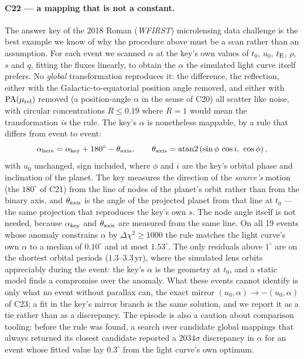 \paragraph{C22 --- a mapping that is not a constant.}  The answer key of
the 2018 Roman (\textit{WFIRST}) microlensing data challenge
\citep{Penny:2019} is the best example we know of why the procedure above
must be a scan rather than an assumption.  For each event we scanned
$\alpha$ at the key's own values of $t_0$, $u_0$, $t_{\rm E}$, $\rho$, $s$
and $q$, fitting the fluxes linearly, to obtain the $\alpha$ the simulated
light curve itself prefers.  No \emph{global} transformation reproduces it:
the difference, the reflection, either with the Galactic-to-equatorial
position angle removed, and either with ${\rm PA}(\mu_{\rm rel})$ removed
(a position-angle $\alpha$ in the sense of C20) all scatter like noise, with
circular concentrations $R \le 0.19$ where $R = 1$ would mean the
transformation \emph{is} the rule.  The key's $\alpha$ is nonetheless
mappable, by a rule that differs from event to event:
\begin{equation}
  \alpha_{\rm here} = \alpha_{\rm key} + 180^\circ - \theta_{\rm axis},
  \qquad
  \theta_{\rm axis} = \mathrm{atan2}\left(\sin\phi\,\cos i,\ \cos\phi\right),
  \label{eq:dc18alpha}
\end{equation}
with $u_0$ unchanged, sign included, where $\phi$ and $i$ are the key's
orbital phase and inclination of the planet.  The key measures the
direction of the \emph{source's} motion (the $180^\circ$ of C21) from the
line of nodes of the planet's orbit rather than from the binary axis, and
$\theta_{\rm axis}$ is the angle of the projected planet from that line at
$t_0$ --- the same projection that reproduces the key's own $s$.  The node
angle itself is not needed, because $\alpha_{\rm key}$ and $\theta_{\rm
axis}$ are measured from the same line.  On all 19 events whose anomaly
constrains $\alpha$ by $\Delta\chi^2 \ge 1000$ the rule matches the light
curve's own $\alpha$ to a median of $0.10^\circ$ and at most $1.53^\circ$.
The only residuals above $1^\circ$ are on the shortest orbital periods
($1.3$--$3.3$\,yr), where the simulated lens orbits appreciably during the
event: the key's $\alpha$ is the geometry at $t_0$, and a static model finds
a compromise over the anomaly.  What these events cannot identify is only
what no event without parallax can, the exact mirror $(u_0, \alpha)
\rightarrow -(u_0, \alpha)$ of C23; a fit in the key's mirror branch is the
same solution, and we report it as a tie rather than as a discrepancy.
The episode is also a caution about comparison tooling: before the rule was
found, a search over candidate global mappings that always returned its
closest candidate reported a $2034\sigma$ discrepancy in $\alpha$ for an
event whose fitted value lay $0.3^\circ$ from the light curve's own optimum.

